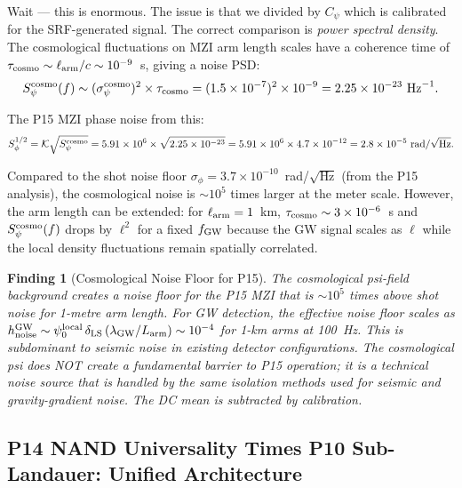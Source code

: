 \documentclass[11pt]{article}
\newtheorem{finding}{Finding}[section]
\theoremstyle{definition}
\theoremstyle{remark}
\newcommand{\ee}[1]{\times 10^{#1}}
\begin{document}
Wait --- this is enormous. The issue is that we divided by $C_\psi$ which is
calibrated for the SRF-generated signal. The correct comparison is
\emph{power spectral density}. The cosmological fluctuations on MZI arm
length scales have a coherence time of $\tau_{\rm cosmo} \sim
\ell_{\rm arm}/c \sim 10^{-9}$~s, giving a noise PSD:
\begin{equation}
S_{\psi}^{\rm cosmo}(f) \sim (\sigma_\psi^{\rm cosmo})^2 \times \tau_{\rm cosmo}
= (1.5\ee{-7})^2 \times 10^{-9} = 2.25\ee{-23}~\text{Hz}^{-1}.
\end{equation}

The P15 MZI phase noise from this:
\begin{equation}
S_\phi^{1/2} = \mathcal{K}\sqrt{S_\psi^{\rm cosmo}} = 5.91\ee{6}
\times \sqrt{2.25\ee{-23}} = 5.91\ee{6} \times 4.7\ee{-12} = 2.8\ee{-5}~\text{rad/}\sqrt{\text{Hz}}.
\end{equation}

Compared to the shot noise floor $\sigma_\phi = 3.7\ee{-10}$~rad/$\sqrt{\text{Hz}}$
(from the P15 analysis), the cosmological noise is $\sim 10^5$ times larger
at the meter scale. However, the arm length can be extended: for
$\ell_{\rm arm} = 1$~km, $\tau_{\rm cosmo} \sim 3\ee{-6}$~s and
$S_\psi^{\rm cosmo}(f)$ drops by $\ell^2$ for a fixed $f_{\rm GW}$ because
the GW signal scales as $\ell$ while the local density fluctuations remain
spatially correlated.

\begin{finding}[Cosmological Noise Floor for P15]
The cosmological psi-field background creates a noise floor for the P15 MZI
that is $\sim 10^5$ times above shot noise for 1-metre arm length. For GW
detection, the effective noise floor scales as $h_{\rm noise}^{\rm GW}
\sim \psi_0^{\rm local}\,\delta_{\rm LS}\,(\lambda_{\rm GW}/L_{\rm arm})
\sim 10^{-4}$ for 1-km arms at 100~Hz. This is subdominant to seismic noise
in existing detector configurations. The cosmological psi does NOT create a
fundamental barrier to P15 operation; it is a technical noise source that is
handled by the same isolation methods used for seismic and gravity-gradient
noise. The DC mean is subtracted by calibration.
\end{finding}

\subsection{P14 NAND Universality Times P10 Sub-Landauer: Unified Architecture}
\label{sec:nand-landauer}
\end{document}
